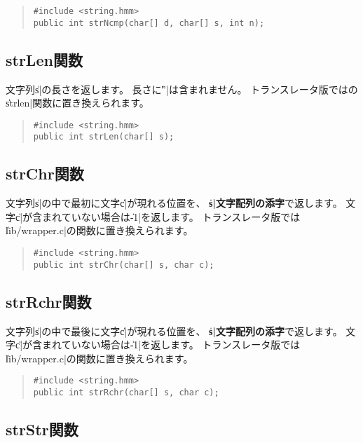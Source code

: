 \begin{quote}
\begin{verbatim}
#include <string.hmm>
public int strNcmp(char[] d, char[] s, int n);
\end{verbatim}
\end{quote}

\subsection{strLen関数}

文字列\|s|の長さを返します。
長さに\|'\0'|は含まれません。
トランスレータ版では\cl の\|strlen|関数に置き換えられます。

\begin{quote}
\begin{verbatim}
#include <string.hmm>
public int strLen(char[] s);
\end{verbatim}
\end{quote}

\subsection{strChr関数}

文字列\|s|の中で最初に文字\|c|が現れる位置を、
{\bf\|s|文字配列の添字}で返します。
文字\|c|が含まれていない場合は\|-1|を返します。
トランスレータ版では\|lib/wrapper.c|の関数に置き換えられます。

\begin{quote}
\begin{verbatim}
#include <string.hmm>
public int strChr(char[] s, char c);
\end{verbatim}
\end{quote}

\subsection{strRchr関数}

文字列\|s|の中で最後に文字\|c|が現れる位置を、
{\bf\|s|文字配列の添字}で返します。
文字\|c|が含まれていない場合は\|-1|を返します。
トランスレータ版では\|lib/wrapper.c|の関数に置き換えられます。

\begin{quote}
\begin{verbatim}
#include <string.hmm>
public int strRchr(char[] s, char c);
\end{verbatim}
\end{quote}

\subsection{strStr関数}

